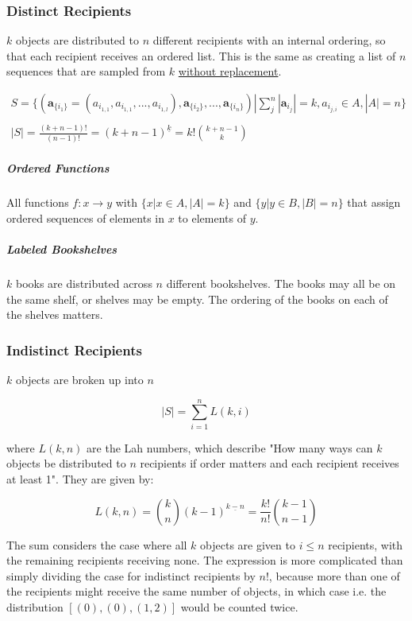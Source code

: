 \subsubsection{Distinct Recipients}
$k$ objects are distributed to $n$ different recipients with an internal ordering, so that each recipient receives an ordered list. This is the same as creating a list of $n$ sequences that are sampled from $k$ \underline{without replacement}. 

\begin{equation}
\begin{array}{l}
S = \{ (\mathbf{a}_{\{i_1\}}  = ( a_{i_{1,1}},a_{i_{1,1}},...,a_{i_{1,l}} ),\mathbf{a}_{\{i_2\}},...,\mathbf{a}_{\{i_n\}}) | \sum^n_j |\mathbf{a}_{i_j}| = k, a_{i_{j,i}} \in A, |A| = n \} \\
\\
|S| = \frac{(k + n - 1)!}{(n-1)!} = ( k+n-1)^{\underline{k}} = k! {k+n-1 \choose k}
\end{array}
\end{equation}


\subparagraph{Ordered Functions}  All functions $f: x \rightarrow y$ with $\{x | x\in A, |A| = k \}$ and $\{y | y\in B, |B| = n\}$ that assign ordered sequences of elements in $x$ to elements of $y$.

\subparagraph{Labeled Bookshelves} $k$ books are distributed across $n$ different bookshelves. The books may all be on the same shelf, or shelves may be empty. The ordering of the books on each of the shelves matters.


\subsubsection{Indistinct Recipients}
$k$ objects are broken up into $n$ 

\begin{equation}
|S| = \sum_{i=1}^n L(k,i) 
\end{equation}

where $L(k,n)$ are the Lah numbers, which describe "How many ways can $k$ objects be distributed to $n$ recipients if order matters and each recipient receives at least 1". They are given by:

\begin{equation}
L(k,n)= {k \choose n} (k-1)^{\underline{k-n}} = \frac{k!}{n!}{ k-1 \choose n-1 }
\end{equation}

The sum considers the case where all $k$ objects are given to $i\leq n$ recipients, with the remaining recipients receiving none. The expression is more complicated than simply dividing the case for indistinct recipients by $n!$, because more than one of the recipients might receive the same number of objects, in which case i.e. the distribution $[(0),(0),(1,2)]$ would be counted twice.

